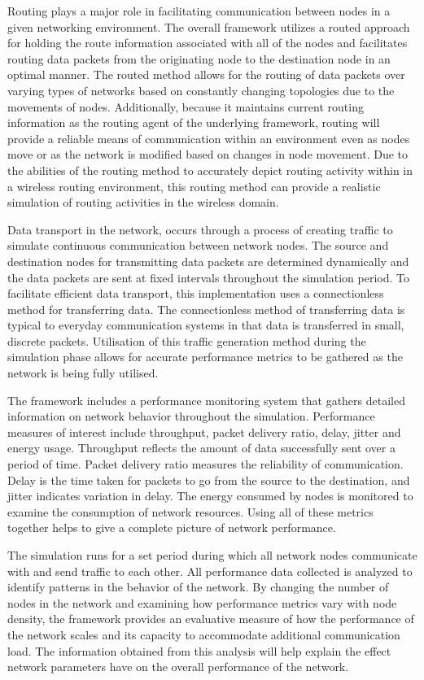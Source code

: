 \documentclass[a4paper,fleqn]{cas-dc}
\numberwithin{equation}{section}
\begin{document}
Routing plays a major role in facilitating communication between nodes in a given networking environment. The overall framework utilizes a routed approach for holding the route information associated with all of the nodes and facilitates routing data packets from the originating node to the destination node in an optimal manner. The routed method allows for the routing of data packets over varying types of networks based on constantly changing topologies due to the movements of nodes. Additionally, because it maintains current routing information as the routing agent of the underlying framework, routing will provide a reliable means of communication within an environment even as nodes move or as the network is modified based on changes in node movement. Due to the abilities of the routing method to accurately depict routing activity within in a wireless routing environment, this routing method can provide a realistic simulation of routing activities in the wireless domain.

Data transport in the network, occurs through a process of creating traffic to simulate continuous communication between network nodes. The source and destination nodes for transmitting data packets are determined dynamically and the data packets are sent at fixed intervals throughout the simulation period. To facilitate efficient data transport, this implementation uses a connectionless method for transferring data. The connectionless method of transferring data is typical to everyday communication systems in that data is transferred in small, discrete packets. Utilisation of this traffic generation method during the simulation phase allows for accurate performance metrics to be gathered as the network is being fully utilised.

The framework includes a performance monitoring system that gathers detailed information on network behavior throughout the simulation. Performance measures of interest include throughput, packet delivery ratio, delay, jitter and energy usage. Throughput reflects the amount of data successfully sent over a period of time. Packet delivery ratio measures the reliability of communication. Delay is the time taken for packets to go from the source to the destination, and jitter indicates variation in delay. The energy consumed by nodes is monitored to examine the consumption of network resources. Using all of these metrics together helps to give a complete picture of network performance.

The simulation runs for a set period during which all network nodes communicate with and send traffic to each other. All performance data collected is analyzed to identify patterns in the behavior of the network. By changing the number of nodes in the network and examining how performance metrics vary with node density, the framework provides an evaluative measure of how the performance of the network scales and its capacity to accommodate additional communication load. The information obtained from this analysis will help explain the effect network parameters have on the overall performance of the network.
\end{document}
